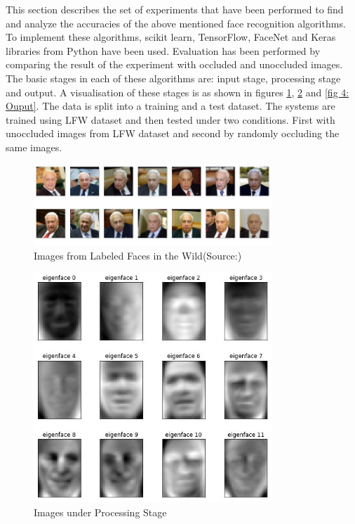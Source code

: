 \documentclass[conference]{IEEEtran}
\begin{document}
\begin{enumerate}
This section describes the set of experiments that have been performed to find and analyze the accuracies of the above mentioned face recognition algorithms. To implement these algorithms, scikit learn, TensorFlow, FaceNet \cite{schroff2015facenet} and Keras libraries from Python have been used. Evaluation has been performed by comparing the result of the experiment with occluded and unoccluded images. The basic stages in each of these algorithms are: input stage, processing stage and output. A visualisation of these stages is as shown in figures \ref{fig 2: dataset}, \ref{fig 3:Processing Stage} and \ref{fig 4: Ouput}. The data is split into a training and a test dataset. The systems are trained using LFW dataset and then tested under two conditions. First with unoccluded images from LFW dataset and second by randomly occluding the same images.

\begin{figure}[h!]
 \centering
 \includegraphics[width = 9cm]{dataset.JPG}
  \caption{ Images from Labeled Faces in the Wild(Source:\cite{LFWTech})}
 \label{fig 2: dataset}
\end{figure}

\begin{figure}[h!]
 \centering
 \includegraphics[width = 9cm]{eigenface.JPG}
 \caption{ Images under Processing Stage}
 \label{fig 3:Processing Stage}
\end{figure}


\end{enumerate}
\end{document}
